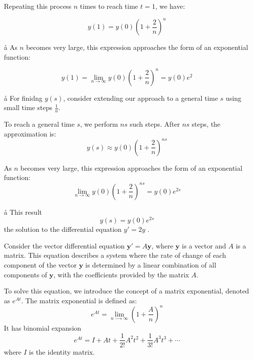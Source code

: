 Repeating this process \( n \) times to reach time \( t = 1 \), we have:

$$
y(1) = y(0)\left(1 + \frac{2}{n}\right)^n
$$

\a\aa
As \( n \) becomes very large, this expression approaches the form of an exponential function:

$$
y(1)=\lim_{n \rightarrow \infty} y(0)\left(1 + \frac{2}{n}\right)^n = y(0)e^{2}
$$

\a\aa
For finidng $y(s)$, consider extending our approach to a general time \( s \) using small time steps \( \frac{1}{n} \).
\vfill

To reach a general time \( s \), we perform \( ns \) such steps. After \( ns \) steps, the approximation is:
$$
y(s) \approx y(0)\left(1 + \frac{2}{n}\right)^{ns}
$$

As \( n \) becomes very large, this expression approaches the form of an exponential function:
$$
\lim_{n \rightarrow \infty} y(0)\left(1 + \frac{2}{n}\right)^{ns} = y(0)e^{2s}
$$

\a\aa
This result  
$$ y(s) = y(0)e^{2s} $$
 the solution to the differential equation \( y' = 2y \) .

\aaa
 

Consider the vector differential equation \( \mathbf{y}' = A\mathbf{y} \), where \( \mathbf{y} \) is a vector and \( A \) is a matrix. This equation describes a system where the rate of change of each component of the vector \( \mathbf{y} \) is determined by a linear combination of all components of \( \mathbf{y} \), with the coefficients provided by the matrix \( A \).

To solve this equation, we introduce the concept of a matrix exponential, denoted as \( e^{At} \). The matrix exponential is defined as:
$$
e^{At} = \lim_{n ⟶  ∞}(1+\frac An)^n 
$$
It has binomial expansion
$$
e^{At}=I + At + \frac{1}{2!}A^2t^2 + \frac{1}{3!}A^3t^3 + \cdots
$$
where \( I \) is the identity matrix.

